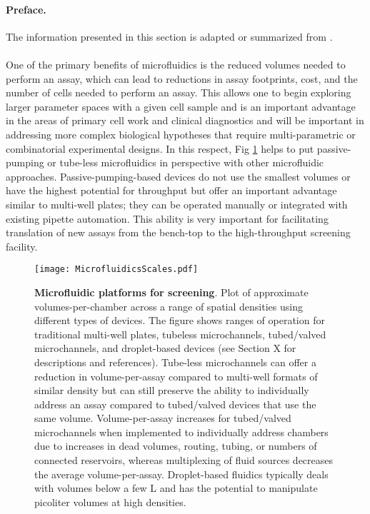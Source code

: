 \paragraph{Preface.}The information presented in this section is adapted or summarized from \cite{Warrick:2008rf}.\\
\\
\noindent One of the primary benefits of microfluidics is the reduced volumes needed to perform an assay, which can lead to reductions in assay footprints, cost, and the number of cells needed to perform an assay. This allows one to begin exploring larger parameter spaces with a given cell sample and is an important advantage in the areas of primary cell work and clinical diagnostics and will be important in addressing more complex biological hypotheses that require multi-parametric or combinatorial experimental designs. In this respect, Fig \ref{chap1:fig:scales} helps to put passive-pumping or tube-less microfluidics in perspective with other microfluidic approaches. Passive-pumping-based devices do not use the smallest volumes or have the highest potential for throughput but offer an important advantage similar to multi-well plates; they can be operated manually or integrated with existing pipette automation. This ability is very important for facilitating translation of new assays from the bench-top to the high-throughput screening facility. 

\begin{figure}[!ht]
\centering
\texttt{[image: MicrofluidicsScales.pdf]}
\caption{\textbf{Microfluidic platforms for screening}. Plot of approximate volumes-per-chamber across a range of spatial densities using different types of devices. The figure shows ranges of operation for traditional multi-well plates, tubeless microchannels, tubed/valved microchannels, and droplet-based devices (see Section X for descriptions and references). Tube-less microchannels can offer a reduction in volume-per-assay compared to multi-well formats of similar density but can still preserve the ability to individually address an assay compared to tubed/valved devices that use the same volume. Volume-per-assay increases for tubed/valved microchannels when implemented to individually address chambers due to increases in dead volumes, routing, tubing, or numbers of connected reservoirs, whereas multiplexing of fluid sources decreases the average volume-per-assay. Droplet-based fluidics typically deals with volumes below a few \textmu L and has the potential to manipulate picoliter volumes at high densities.}
\label{chap1:fig:scales}
\end{figure}


